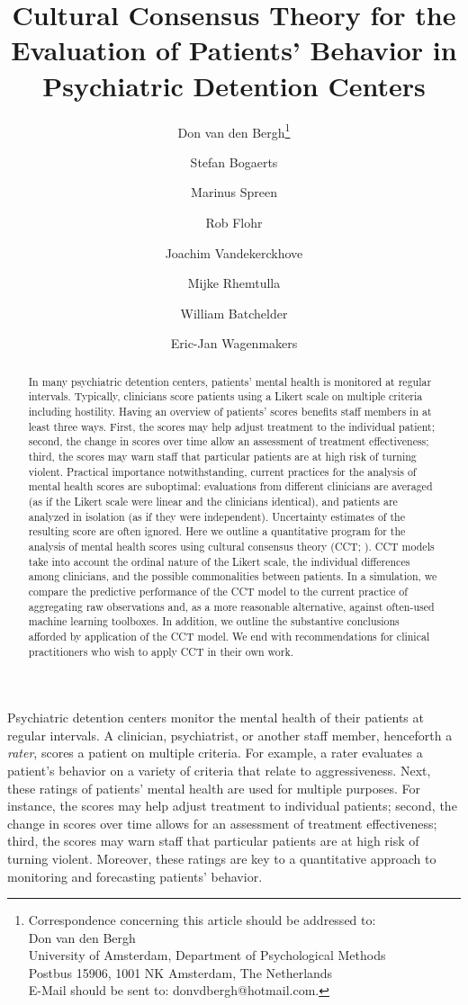 \documentclass{article}
\title{Cultural Consensus Theory for the Evaluation of Patients’ Behavior in Psychiatric  Detention Centers}
\author[1]{Don van den Bergh\thanks{Correspondence concerning this article should be addressed to:  
\\  Don van den Bergh 
\\  University of Amsterdam, Department of Psychological Methods
\\  Postbus 15906, 1001 NK Amsterdam, The Netherlands
\\  E-Mail should be sent to: donvdbergh@hotmail.com.}}
\author[2]{Stefan Bogaerts}
\author[3]{Marinus Spreen}
\author[4]{Rob Flohr}
\author[5]{Joachim Vandekerckhove}
\author[6]{Mijke Rhemtulla}
\author[5]{William Batchelder}
\author[1]{Eric-Jan Wagenmakers}
\affil[1]{University of Amsterdam}
\affil[2]{University of Tilburg}
\affil[3]{Mesdag Clinic}
\affil[4]{Stenden University of Applied Sciences}
\affil[5]{University of California Irvine}
\affil[6]{??}
\date{}
\begin{document}
\listoftodos
\newpage

\maketitle

\begin{abstract}
In many psychiatric detention centers, patients' mental health is monitored at regular intervals. Typically, clinicians score patients using a Likert scale on multiple criteria including hostility. Having an overview of patients’ scores benefits staff members in at least three ways. First, the scores may help adjust treatment to the individual patient; second, the change in scores over time allow an assessment of treatment effectiveness; third, the scores may warn staff that particular patients are at high risk of turning violent. Practical importance notwithstanding, current practices for the analysis of mental health scores are suboptimal: evaluations from different clinicians are averaged (as if the Likert scale were linear and the clinicians identical), and patients are analyzed in isolation (as if they were independent). Uncertainty estimates of the resulting score are often ignored. Here we outline a quantitative program for the analysis of mental health scores using cultural consensus theory (CCT; ). CCT models take into account the ordinal nature of the Likert scale, the individual differences among clinicians, and the possible commonalities between patients. In a simulation, we compare the predictive performance of the CCT model to the current practice of aggregating raw observations and, as a more reasonable alternative, against often-used machine learning toolboxes. In addition, we outline the substantive conclusions afforded by application of the CCT model. We end with recommendations for clinical practitioners who wish to apply CCT in their own work. 
\end{abstract}



Psychiatric detention centers monitor the mental health of their patients at regular intervals. A clinician, psychiatrist, or another staff member, henceforth a \textit{rater}, scores a patient on multiple criteria. For example, a rater evaluates a patient's behavior on a variety of criteria that relate to aggressiveness. Next, these ratings of patients' mental health are used for multiple purposes. For instance, the scores may help adjust treatment to individual patients; second, the change in scores over time allows for an assessment of treatment effectiveness; third, the scores may warn staff that particular patients are at high risk of turning violent. Moreover, these ratings are key to a quantitative approach to monitoring and forecasting patients' behavior.
\end{document}
